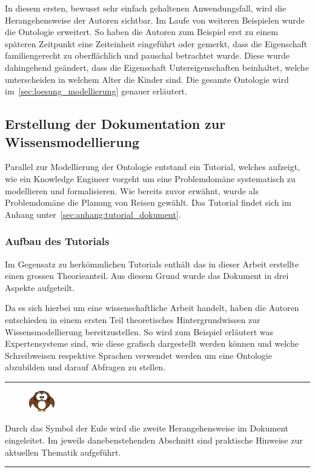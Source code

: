 In diesem ersten, bewusst sehr einfach gehaltenen Anwendungsfall, wird die Herangehensweise der Autoren sichtbar. Im Laufe von weiteren Beispielen wurde die Ontologie erweitert. So haben die Autoren zum Beispiel erst zu einem späteren Zeitpunkt eine Zeiteinheit eingeführt oder gemerkt, dass die Eigenschaft familiengerecht zu oberflächlich und pauschal betrachtet wurde. Diese wurde dahingehend geändert, dass die Eigenschaft Untereigenschaften beinhaltet, welche unterscheiden in welchem Alter die Kinder sind. Die gesamte Ontologie wird im~\autoref{sec:loesung_modellierung} genauer erläutert.

\subsection{Erstellung der Dokumentation zur Wissensmodellierung}
\label{subsec:dokumentation_wissensmodellierung}
Parallel zur Modellierung der Ontologie entstand ein Tutorial, welches aufzeigt, wie ein Knowledge Engineer vorgeht um eine Problemdomäne systematisch zu modellieren und formalisieren. Wie bereits zuvor erwähnt, wurde als Problemdomäne die Planung von Reisen gewählt. Das Tutorial findet sich im Anhang unter~\ref{sec:anhang:tutorial_dokument}.

\subsubsection{Aufbau des Tutorials}
\label{subsec:dokumentation_wissensmodellierung_aufbau}
Im Gegensatz zu herkömmlichen Tutorials enthält das in dieser Arbeit erstellte einen grossen Theorieanteil. Aus diesem Grund wurde das Dokument in drei Aspekte aufgeteilt.

Da es sich hierbei um eine wissenschaftliche Arbeit handelt, haben die Autoren entschieden in einem ersten Teil theoretisches Hintergrundwissen zur Wissensmodellierung bereitzustellen. So wird zum Beispiel erläutert was Expertensysteme sind, wie diese grafisch dargestellt werden können und welche Schreibweisen respektive Sprachen verwendet werden um eine Ontologie abzubilden und darauf Abfragen zu stellen.

\noindent\rule[1ex]{\textwidth}{1pt}
\begin{figure}
    \vspace{-18pt}
    \includegraphics[width=0.1\textwidth]{bilder/owl.png}
\end{figure}
Durch das Symbol der Eule wird die zweite Herangehensweise im Dokument eingeleitet. Im jeweils danebenstehenden Abschnitt sind praktische Hinweise zur aktuellen Thematik aufgeführt.\\
\noindent\rule[1ex]{\textwidth}{1pt}


